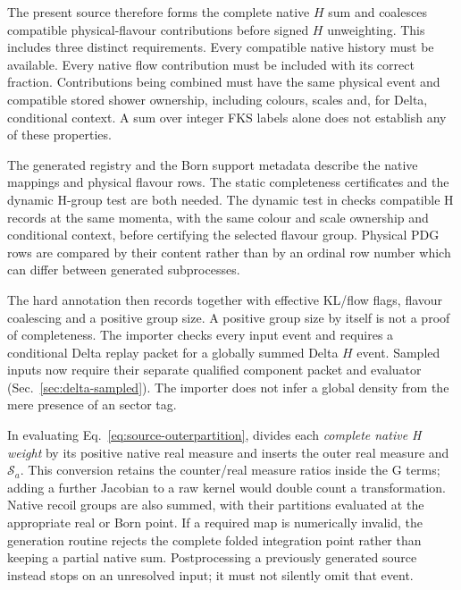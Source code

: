 The present source therefore forms the complete native $H$ sum and
coalesces compatible physical-flavour contributions before signed $H$
unweighting. This includes three distinct requirements. Every compatible
native history must be available. Every native flow contribution must be
included with its correct fraction. Contributions being combined must
have the same physical event and compatible stored shower ownership,
including colours, scales and, for Delta, conditional context. A sum over
integer FKS labels alone does not establish any of these properties.

The generated registry  and the Born
support metadata describe the native mappings and physical flavour rows.
The static completeness certificates and the dynamic H-group test are
both needed. The dynamic test in  checks
compatible H records at the same momenta, with the same colour and scale
ownership and conditional context, before certifying the selected flavour
group. Physical PDG rows are compared by their content rather than by an
ordinal row number which can differ between generated subprocesses.

The hard annotation then records
 together with effective KL/flow
flags, flavour coalescing and a positive group size. A positive group size
by itself is not a proof of completeness. The importer
 checks every input event and
requires a conditional Delta replay packet for a globally summed
Delta $H$ event. Sampled inputs now require their separate qualified
component packet and evaluator (Sec.~\ref{sec:delta-sampled}). The
importer does not infer a global density from the mere presence
of an  sector tag.

In evaluating Eq.~\eqref{eq:source-outerpartition},
 divides each \emph{complete native H
weight} by its positive native real measure and inserts the outer real
measure and $\mathcal S_a$. This conversion retains the counter/real
measure ratios inside the G terms; adding a further Jacobian to a raw
kernel would double count a transformation. Native recoil groups are
also summed, with their partitions evaluated at the appropriate real or
Born point. If a required map is numerically invalid, the generation
routine rejects the complete folded integration point rather than
keeping a partial native sum. Postprocessing a previously generated
source instead stops on an unresolved input; it must not silently omit
that event.

